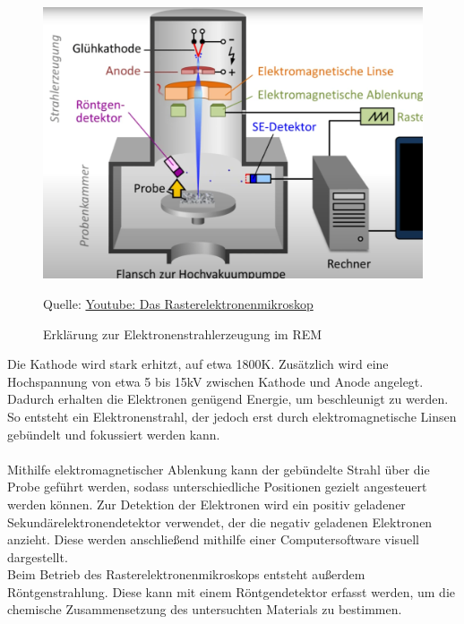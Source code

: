  \newpage
\vspace{0.2cm}
\begin{figure}
    \centering
    \includegraphics[scale=0.3]{Bilder/Screenshot 2025-04-10 165235}
    \caption{Erklärung zur Elektronenstrahlerzeugung im REM}
    \par Quelle: \href{https://www.youtube.com/watch?v=uXjXx63Nb6k&t=286s}{Youtube: Das Rasterelektronenmikroskop}
    \vspace{0.2cm}
    \label{Abb.1: Erklärung zur Elektronenstrahlerzeugung im REM }
\end{figure} 
\vspace{0.2cm}
Die Kathode wird stark erhitzt, auf etwa 1800K. Zusätzlich wird eine Hochspannung von etwa 5 bis 15kV zwischen Kathode und Anode angelegt. 
Dadurch erhalten die Elektronen genügend Energie, um beschleunigt zu werden. So entsteht ein Elektronenstrahl, der jedoch erst durch elektromagnetische Linsen gebündelt und fokussiert werden kann.
\\ \\
Mithilfe elektromagnetischer Ablenkung kann der gebündelte Strahl über die Probe geführt werden, sodass unterschiedliche Positionen gezielt angesteuert werden können. 
Zur Detektion der Elektronen wird ein positiv geladener Sekundärelektronendetektor verwendet, der die negativ geladenen Elektronen anzieht. Diese werden anschließend mithilfe einer Computersoftware visuell dargestellt.
\\
Beim Betrieb des Rasterelektronenmikroskops entsteht außerdem Röntgenstrahlung.\cite{key1} 
Diese kann mit einem Röntgendetektor erfasst werden, um die chemische Zusammensetzung des untersuchten Materials zu bestimmen.